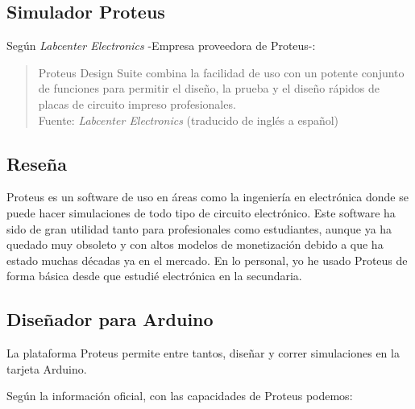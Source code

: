 \documentclass{article}
\begin{document}
    \subsection{Simulador Proteus}

    Según \textit{Labcenter Electronics}\cite{labcenter-electronics-2022}
    -Empresa proveedora de Proteus-:

    \begin{quote}
        Proteus Design Suite combina la facilidad de uso con un potente
        conjunto de funciones para permitir el diseño, la prueba y el diseño
        rápidos de placas de circuito impreso profesionales.\\ \footnotesize
        Fuente: \textit{Labcenter Electronics} (traducido de inglés a
        español) \cite{labcenter-electronics-2022}
    \end{quote}

    \subsection{Reseña}

    Proteus es un software de uso en áreas como la ingeniería en electrónica
    donde se puede hacer simulaciones de todo tipo de circuito electrónico.
    Este software ha sido de gran utilidad tanto para profesionales como
    estudiantes, aunque ya ha quedado muy obsoleto y con altos modelos de
    monetización debido a que ha estado muchas décadas ya en el mercado. En
    lo personal, yo he usado Proteus de forma básica desde que estudié
    electrónica en la secundaria.

    \subsection{Diseñador para Arduino}

    La plataforma Proteus permite entre tantos, diseñar y correr simulaciones
    en la tarjeta Arduino.

    \bigbreak

    Según la información oficial, con las capacidades de Proteus podemos:
\end{document}
